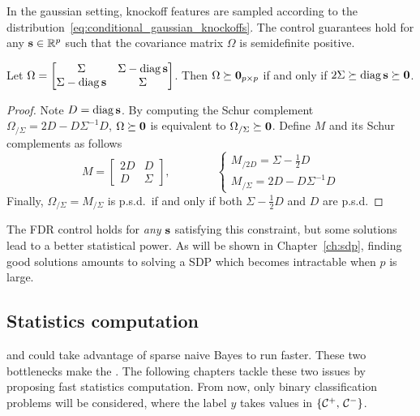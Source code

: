 In the gaussian setting,
knockoff features are sampled according to the distribution~\ref{eq:conditional_gaussian_knockoffs}.
The control guarantees hold for any $\mathbf{s} \in \mathbb{R}^p$ such that the covariance matrix $\Omega$ is semidefinite positive.
\begin{proposition}\label{prop:omega_psd}
    Let $\Omega = \begin{bmatrix}
        \Sigma & \Sigma - \operatorname*{diag} \mathbf{s}\\
        \Sigma - \operatorname*{diag} \mathbf{s} & \Sigma
    \end{bmatrix}$.
    Then $\Omega \succeq \mathbf{0}_{p \times p}$ if and only if $2\Sigma \succeq \operatorname*{diag} \mathbf{s} \succeq \mathbf{0}$.
\end{proposition}
\begin{proof}
    Note $D = \operatorname*{diag}\mathbf{s}$.
    By computing the Schur complement~\cite{schur_complement}
    $\Omega_{/\Sigma} = 2D - D\Sigma^{-1}D$,
    $\Omega \succeq \mathbf{0}$ is equivalent to $\Omega_{/\Sigma} \succeq \mathbf{0}$.
    Define $M$ and its Schur complements as follows
    \begin{equation*}
        M = \begin{bmatrix}
            2D & D\\
            D & \Sigma
        \end{bmatrix}
        ,\qquad\qquad
        \begin{cases*}
            M_{/2D} = \Sigma - \frac{1}{2}D\\
            M_{/\Sigma} = 2D - D\Sigma^{-1}D
        \end{cases*}
    \end{equation*}
    Finally, $\Omega_{/\Sigma} = M_{/\Sigma}$ is p.s.d.\ if and only if both $\Sigma - \frac{1}{2}D$ and $D$ are p.s.d.
\end{proof}
The FDR control holds for \emph{any} $\mathbf{s}$ satisfying this constraint,
but some solutions lead to a better statistical power.
As will be shown in Chapter~\ref{ch:sdp},
finding good solutions amounts to solving a SDP which becomes intractable when $p$ is large.

\subsection{Statistics computation}\label{subsec:bot_stats}

and could take advantage of sparse naive Bayes to run faster.
\bigbreak
These two bottlenecks make the .
The following chapters tackle these two issues by proposing fast statistics computation.
From now, only binary classification problems will be considered, where the label $y$ takes values
in $\left\{ \mathcal{C}^+,\, \mathcal{C}^- \right\}$.

